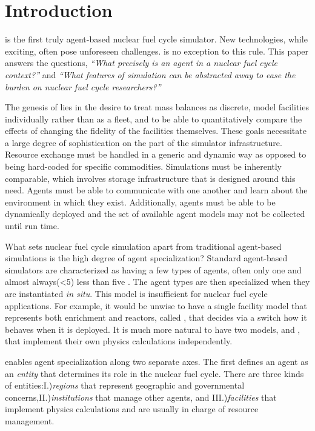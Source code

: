 \section{Introduction}
\label{sec-intro}

\Cyclus \cite{cyclus_v1_0,cyclus_v1_2,huff_fundamental_2016} is the first truly agent-based 
\cite{jennings2000agent} nuclear fuel cycle simulator. 
New technologies, while exciting, often pose unforeseen challenges.
\Cyclus is no exception to this rule.  This paper answers the questions,
\emph{``What precisely is an agent in a nuclear fuel cycle context?''} and 
\emph{``What features of simulation can be abstracted away to ease the burden 
on nuclear fuel cycle researchers?''}

The genesis of \cyclus lies in the desire to 
treat mass balances as discrete, model facilities individually rather than as 
a fleet, and to be able to quantitatively compare the effects of changing the 
fidelity of the facilities themselves. These goals necessitate a large degree of 
sophistication on the part of the simulator infrastructure.  Resource exchange
must be handled in a generic and dynamic way as opposed to being hard-coded 
for specific commodities. Simulations must be inherently comparable, which involves 
storage infrastructure that is designed around this need. Agents must be able 
to communicate with one another and learn about the environment in which they 
exist. Additionally, agents must be able to be dynamically deployed and the set of 
available agent models may not be collected until run time. 

What sets nuclear fuel cycle simulation apart from traditional agent-based simulations 
is the high degree of agent specialization? Standard agent-based simulators
are characterized as having a few types of agents, often only one and 
almost always(<5) less than five \cite{taylor2014agent}. The agent types are then 
specialized 
when they are instantiated \emph{in situ}. This model is insufficient for 
nuclear fuel cycle applications.  For example, it would be unwise to have a single facility model 
that represents both enrichment and reactors, called ,
that decides via a switch how it behaves when it is deployed. It is much 
more natural to have two models,  and , 
that implement their own physics calculations independently.

\Cyclus enables agent specialization along two separate axes. The first defines 
an agent as an \emph{entity} that determines its role in the 
nuclear fuel cycle. There are three kinds of entities:I.)\emph{regions} that 
represent geographic and governmental concerns,II.)\emph{institutions} 
that manage other agents, and III.)\emph{facilities} that implement 
physics calculations and are usually in charge of resource management.

